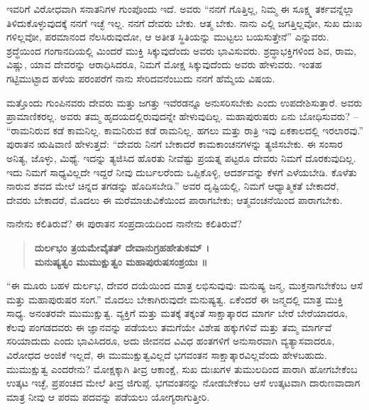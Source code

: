 ಇವರಿಗೆ ವಿರೋಧವಾಗಿ ಸನಾತನಿಗಳ ಗುಂಪೊಂದು ಇದೆ. ಅವರು “ನನಗೆ ಗೊತ್ತಿಲ್ಲ, ನಿಮ್ಮ ಈ ಸೂಕ್ಷ್ಮ ತರ್ಕವನ್ನೆಲ್ಲಾ ತಿಳಿದುಕೊಳ್ಳುವುದಕ್ಕೆ ನನಗೆ ಇಚ್ಛೆ ಇಲ್ಲ. ನನಗೆ ದೇವರು ಬೇಕು. ಆತ್ಮ ಬೇಕು. ನಾನು ಎಲ್ಲಿ ಜಗತ್ತಿಲ್ಲವೋ, ಸುಖ ದುಃಖ ಗಳಿಲ್ಲವೋ, ಪರಮಾನಂದ ನೆಲಸಿರುವುದೋ, ಆ ಅತೀತ ಸ್ಥಿತಿಯನ್ನು ಮುಟ್ಟಲು ಬಯಸುತ್ತೇನೆ” ಎನ್ನುವರು. ಶ್ರದ್ಧೆಯಿಂದ ಗಂಗಾನದಿಯಲ್ಲಿ ಮಿಂದರೆ ಮುಕ್ತಿ ಸಿಕ್ಕುವುದೆಂದು ಅವರು ಭಾವಿಸುವರು. ಶ್ರದ್ಧಾಭಕ್ತಿಗಳಿಂದ ಶಿವ, ರಾಮ, ವಿಷ್ಣು, ಯಾವ ದೇವರನ್ನು ಆರಾಧಿಸಿದರೂ, ನಿಮಗೆ ಮೋಕ್ಷ ಸಿಕ್ಕುವುದೆಂದು ಅವರು ಹೇಳುವರು. ಇಂತಹ ಗಟ್ಟಿಮುಟ್ಟಾದ ಹಳೆಯ ಪರಂಪರೆಗೆ ನಾನು ಸೇರಿದವನೆಂಬುದು ನನಗೆ ಹೆಮ್ಮೆಯ ವಿಷಯ.

ಮತ್ತೊಂದು ಗುಂಪಿನವರು ದೇವರು ಮತ್ತು ಜಗತ್ತು ಇವೆರಡನ್ನೂ ಅನುಸರಿಸಬೇಕು ಎಂದು ಉಪದೇಶಿಸುತ್ತಾರೆ. ಅವರು ಪ್ರಾಮಾಣಿಕರಲ್ಲ. ಅವರು ತಮ್ಮ ಹೃದಯದಲ್ಲಿರುವುದನ್ನೇ ಹೇಳುವುದಿಲ್ಲ. ಮಹಾಪುರುಷರು ಏನು ಬೋಧಿಸುವರು? – “ರಾಮನಿರುವ ಕಡೆ ಕಾಮನಿಲ್ಲ. ಕಾಮನಿರುವ ಕಡೆ ರಾಮನಿಲ್ಲ. ಹಗಲು ಮತ್ತು ರಾತ್ರಿ ಇವು ಏಕಕಾಲದಲ್ಲಿ ಇರಲಾರವು.” ಪುರಾತನ ಋಷಿವಾಣಿ ಹೇಳುತ್ತದೆ: “ದೇವರು ನಿನಗೆ ಬೇಕಾದರೆ ಕಾಮಕಾಂಚನಗಳನ್ನು ತ್ಯಜಿಸಬೇಕು. ಈ ಸಂಸಾರ ಅನಿತ್ಯ, ಜೊಳ್ಳು, ಮಿಥ್ಯೆ. ಇದನ್ನು ತ್ಯಜಿಸಿದ ಹೊರತು ನೀವೆಷ್ಟು ಪ್ರಯತ್ನ ಪಟ್ಟರೂ ದೇವರು ನಿಮಗೆ ದೊರಕುವುದಿಲ್ಲ. ಇದು ನಿಮಗೆ ಸಾಧ್ಯವಿಲ್ಲದೇ ಇದ್ದರೆ ನೀವು ದುರ್ಬಲರೆಂದು ಒಪ್ಪಿಕೊಳ್ಳಿ, ಆದರ್ಶವನ್ನು ಕೆಳಗೆ ಎಳೆಯಬೇಡಿ. ಕೊಳೆತು ನಾರುವ ಶವದ ಮೇಲೆ ಚಿನ್ನದ ತಗಡನ್ನು ಹೊದಿಸಬೇಡಿ.” ಅವರ ದೃಷ್ಟಿಯಲ್ಲಿ, ನಿಮಗೆ ಆಧ್ಯಾತ್ಮಿಕತೆ ಬೇಕಾದರೆ, ದೇವರು ಬೇಕಾದರೆ, ಮೊದಲು ಈ ಮರೆಮಾಚುವಿಕೆಯಿಂದ ಪಾರಾಗಬೇಕು; ಆತ್ಮವಂಚನೆಯಿಂದ ಪಾರಾಗಬೇಕು.

\newpage

ನಾನೇನು ಕಲಿತಿರುವೆ? ಈ ಪುರಾತನ ಸಂಪ್ರದಾಯದಿಂದ ನಾನೇನು ಕಲಿತಿರುವೆ?
\begin{verse}
\textbf{ದುರ್ಲಭಂ ತ್ರಯಮೇವೈತತ್​ ದೇವಾನುಗ್ರಹಹೇತುಕಮ್​ ।} \\
\textbf{ಮನುಷ್ಯತ್ವಂ ಮುಮುಕ್ಷುತ್ವಂ ಮಹಾಪುರುಷಸಂಶ್ರಯಃ ॥} 
\end{verse}

“ಈ ಮೂರು ಬಹಳ ದುರ್ಲಭ, ದೇವರ ದಯೆಯಿಂದ ಮಾತ್ರ ಲಭಿಸುವುವು: ಮನುಷ್ಯ ಜನ್ಮ, ಮುಕ್ತನಾಗಬೇಕೆಂಬ ಆಸೆ ಮತ್ತು ಮಹಾಪುರುಷರ ಸಂಗ.” ಮೊದಲು ಬೇಕಾಗಿರುವುದೇ ಮನುಷ್ಯತ್ವ. ಏಕೆಂದರೆ ಈ ಜನ್ಮದಲ್ಲಿ ಮಾತ್ರ ಮುಕ್ತಿ ಸಾಧ್ಯ. ಅನಂತರವೇ ಮುಮುಕ್ಷುತ್ವ. ವ್ಯಕ್ತಿಗೆ ಮತ್ತು ಮತಕ್ಕೆ ತಕ್ಕಂತೆ ಸಾಕ್ಷಾತ್ಕಾರದ ಮಾರ್ಗ ಬೇರೆ ಬೇರೆಯಾದರೂ, ಕೆಲವು ಪಂಗಡದವರು ಈ ಜ್ಞಾನವನ್ನು ಪಡೆಯಲು ತಮಗೆಯೇ ವಿಶೇಷ ಹಕ್ಕುಗಳಿವೆ ಮತ್ತು ತಮ್ಮ ಮಾರ್ಗವೆ ಸರಿಯಾದುದು ಎಂದು ಭಾವಿಸಿದರೂ, ಅದು ಜೀವನದ ವಿವಿಧ ಹಂತಗಳಿಗೆ ಅನುಸಾರವಾಗಿ ವ್ಯತ್ಯಾಸವಾದರೂ, ವಿರೋಧದ ಅಂಜಿಕೆ ಇಲ್ಲದೆ, ಈ ಮುಮುಕ್ಷುತ್ವವಿಲ್ಲದೆ ಭಗವಂತನ ಸಾಕ್ಷಾತ್ಕಾರವಿಲ್ಲವೆಂದು ಹೇಳಬಹುದು. ಮುಮುಕ್ಷುತ್ವ ಎಂದರೇನು? ಮೋಕ್ಷಕ್ಕಾಗಿ ತೀವ್ರ ಆಕಾಂಕ್ಷೆ, ಸುಖ ದುಃಖಗಳ ತುಮುಲದಿಂದ ಪಾರಾಗಿ ಹೋಗಬೇಕೆಂಬ ಉತ್ಕಟ ಇಚ್ಛೆ, ಪ್ರಪಂಚದ ಮೇಲೆ ತೀವ್ರ ಜಿಗುಪ್ಸೆ. ಭಗವಂತನನ್ನು ನೋಡಬೇಕೆಂಬ ಆಸೆ ಉತ್ಕಟವಾಗಿ ದಾರುಣವಾದಾಗ ಮಾತ್ರ ನೀವು ಆ ಪರಮ ಪದವನ್ನು ಪಡೆಯಲು ಯೋಗ್ಯರಾಗುತ್ತೀರಿ.

\vskip 5pt

